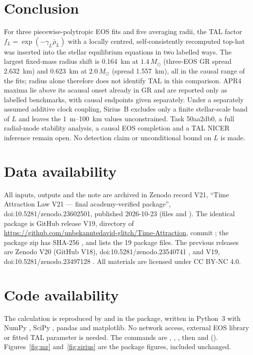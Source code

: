 \documentclass[11pt,a4paper]{article}
\newcommand{\Msun}{M_\odot}
\begin{document}
\section{Conclusion}
For three piecewise-polytropic EOS fits and five averaging radii, the TAL factor $f_L=\exp(-\gamma_L\bar\rho_L)$
with a locally centred, self-consistently recomputed top-hat was inserted into the stellar equilibrium equations
in two labelled ways. The largest fixed-mass radius shift is 0.164~km at $1.4\,\Msun$ (three-EOS GR spread
2.632~km) and 0.623~km at $2.0\,\Msun$ (spread 1.557~km), all in the causal range of the fits; radius alone
therefore does not identify TAL in this comparison. APR4 maxima lie above its acausal onset already in GR and are
reported only as labelled benchmarks, with causal endpoints given separately. Under a separately assumed
additive clock coupling, Sirius~B excludes only a finite stellar-scale band of $L$ and leaves the 1~m--100~km
values unconstrained. Task 50aa2db0, a full radial-mode stability analysis, a causal EOS completion and a TAL
NICER inference remain open. No detection claim or unconditional bound on $L$ is made.

\section*{Data availability}
All inputs, outputs and the note are archived in Zenodo record V21, ``Time Attraction Law V21 --- final
academy-verified package'', doi:10.5281/zenodo.23602501, published 2026-10-23 \cite{v21} (files
 and ). The identical package is GitHub release V19,
directory  of \url{https://github.com/unbekanntedavid-glitch/Time-Attraction}, commit
\texttt{} \cite{gh}; the package zip  has SHA-256
\texttt{}, and  lists the 19
package files. The previous releases are Zenodo V20 (GitHub V18), doi:10.5281/zenodo.23540741 \cite{v20}, and V19,
doi:10.5281/zenodo.23497128 \cite{v19}. All materials are licensed under CC BY-NC 4.0.

\section*{Code availability}
The calculation is reproduced by  and  in the package, written in
Python~3 with NumPy \cite{numpy}, SciPy \cite{scipy}, pandas and matplotlib. No network access, external EOS library or fitted
TAL parameter is needed. The commands are
, , , then
 and  (). Figures~\ref{fig:mr}
and~\ref{fig:sirius} are the package figures, included unchanged.
\end{document}
